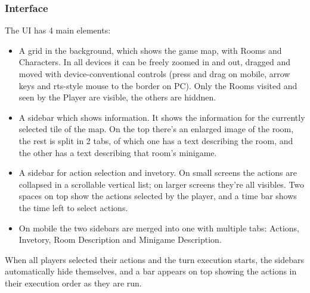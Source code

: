 \subsubsection{Interface}
The UI has 4 main elements: 

\begin{itemize}
	\item A grid in the background, which shows the game map, with Rooms and Characters. In all devices it can be freely zoomed in and out, dragged and moved with device-conventional controls (press and drag on mobile, arrow keys and rts-style mouse to the border on PC). Only the Rooms visited and seen by the Player are visible, the others are hiddnen.
	\item A sidebar which shows information. It shows the information for the currently selected tile of the map. On the top there's an enlarged image of the room, the rest is split in 2 tabs, of which one has a text describing the room, and the other has a text describing that room's minigame.
	\item A sidebar for action selection and invetory. On small screens the actions are collapsed in a scrollable vertical list; on larger screens they're all visibles. Two spaces on top show the actions selected by the player, and a time bar shows the time left to select actions.
	\item On mobile the two sidebars are merged into one with multiple tabs: Actions, Invetory, Room Description and Minigame Description.
\end{itemize}

When all players selected their actions and the turn execution starts, the sidebars automatically hide themselves, and a bar appears on top showing the actions in their execution order as they are run.


\pagebreak 